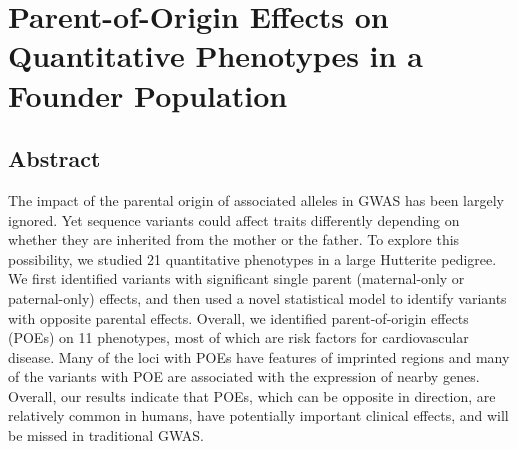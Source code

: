 \chapter{Parent-of-Origin Effects on Quantitative Phenotypes in a Founder Population}\label{ch:pogwas}
\section[Abstract]{Abstract\footnotemark}


The impact of the parental origin of associated alleles in GWAS has been largely ignored. Yet sequence variants could affect traits differently depending on whether they are inherited from the mother or the father. To explore this possibility, we studied 21 quantitative phenotypes in a large Hutterite pedigree. We first identified variants with significant single parent (maternal-only or paternal-only) effects, and then used a novel statistical model to identify variants with opposite parental effects. Overall, we identified parent-of-origin effects (POEs) on 11 phenotypes, most of which are risk factors for cardiovascular disease. Many of the loci with POEs have features of imprinted regions and many of the variants with POE are associated with the expression of nearby genes. Overall, our results indicate that POEs, which can be opposite in direction, are relatively common in humans, have potentially important clinical effects, and will be missed in traditional GWAS. 




